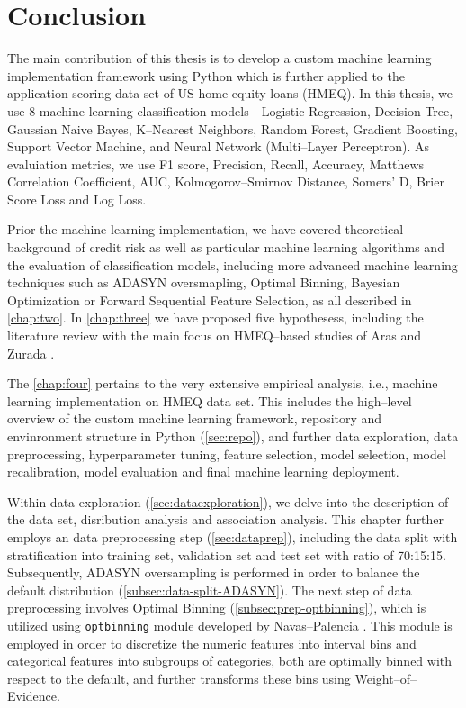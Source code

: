 \chapter{Conclusion}
\label{conclusion}

The main contribution of this thesis is to develop a custom machine learning implementation framework using Python which is further applied to the application scoring data set of US home equity loans (HMEQ).
In this thesis, we use 8 machine learning classification models - Logistic Regression, Decision Tree, Gaussian Naive Bayes, K--Nearest Neighbors, Random Forest, Gradient Boosting, Support Vector Machine, and Neural Network (Multi--Layer Perceptron). As evaluiation metrics, we use F1 score, Precision, Recall, Accuracy, Matthews Correlation Coefficient, AUC, Kolmogorov--Smirnov Distance, Somers' D, Brier Score Loss and Log Loss.

Prior the machine learning implementation, we have covered theoretical background of credit risk as well as particular machine learning algorithms and the evaluation of classification models, including more advanced machine learning techniques such as ADASYN oversmapling, Optimal Binning, Bayesian Optimization or Forward Sequential Feature Selection, as all described in \autoref{chap:two}.
In \autoref{chap:three} we have proposed five hypothesess, including the literature review with the main focus on HMEQ--based studies of Aras \citep{serkan2021bagging} and Zurada \citep{zurada2014classification}.

The \autoref{chap:four} pertains to the very extensive empirical analysis, i.e., machine learning implementation on HMEQ data set.  This includes the high--level overview of the custom machine learning framework, repository and envinronment structure in Python (\autoref{sec:repo}), and further data exploration, data preprocessing, hyperparameter tuning, feature selection, model selection, model recalibration, model evaluation and final machine learning deployment.


Within data exploration (\autoref{sec:dataexploration}), we delve into the description of the data set, disribution analysis and association analysis.
This chapter further employs an data preprocessing step (\autoref{sec:dataprep}), including the data split with stratification into training set, validation set  and test set with ratio of 70:15:15.
Subsequently, ADASYN oversampling is performed in order to balance the default distribution (\autoref{subsec:data-split-ADASYN}).
The next step of data preprocessing involves Optimal Binning (\autoref{subsec:prep-optbinning}), which is utilized using \lstinline{optbinning} module developed by Navas--Palencia \citep{navas2020optimal}. This module is employed in order to discretize the numeric features into interval bins and categorical features into subgroups of categories, both are optimally binned with respect to the default, and further transforms these bins using Weight--of--Evidence.


